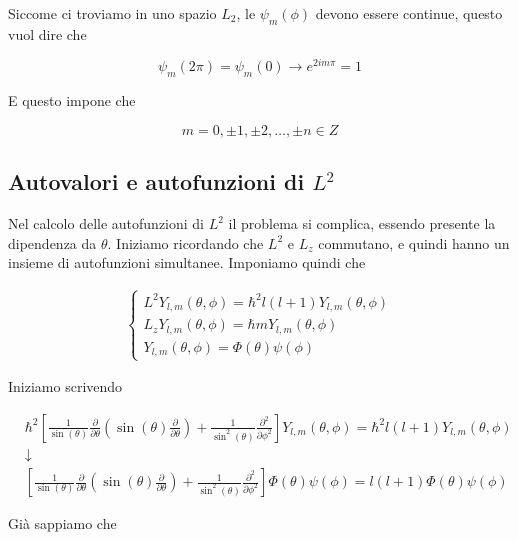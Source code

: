 Siccome ci troviamo in uno spazio $L_2$, le $\psi_m(\phi)$ devono essere continue, questo vuol dire che

\begin{equation}
\psi_m(2\pi)= \psi_m(0) \rightarrow e^{2i m \pi}= 1
\end{equation}

E questo impone che 

\begin{equation}
m= 0, \pm 1, \pm 2, \dots , \pm n  \in Z
\end{equation}

\newpage

\subsection{Autovalori e autofunzioni di $L^2$}

Nel calcolo delle autofunzioni di $L^2$ il problema si complica, essendo presente la dipendenza da $\theta$. Iniziamo ricordando che $L^2$ e $L_z$ commutano, e quindi hanno un insieme di autofunzioni simultanee. Imponiamo quindi che

\begin{align}
\left\{\begin{array}{ccc}
L^2 Y_{l,m}(\theta, \phi)= \hbar^2 l(l+1) Y_{l,m} (\theta, \phi)\\
L_z Y_{l,m}(\theta, \phi)= \hbar m Y_{l,m}(\theta, \phi) \qquad \; \: \\
Y_{l,m}(\theta, \phi)= \Phi(\theta)\psi(\phi) \qquad \; \; \,
\end{array}\right. 
\end{align}

Iniziamo scrivendo

\begin{align}
{}&\hbar^2 \left[\frac{1}{\sin(\theta)}\frac{\partial}{\partial \theta}\left(\sin(\theta)\frac{\partial}{\partial \theta}\right) + \frac{1}{\sin^2(\theta)}\frac{\partial^2}{\partial \phi^2} 
\right] Y_{l,m}(\theta, \phi)= \hbar^2 l(l+1) Y_{l,m} (\theta, \phi) \nonumber \\
&\downarrow \nonumber \\
&\left[\frac{1}{\sin(\theta)}\frac{\partial}{\partial \theta}\left(\sin(\theta)\frac{\partial}{\partial \theta}\right) + \frac{1}{\sin^2(\theta)}\frac{\partial^2}{\partial \phi^2} 
\right] \Phi(\theta)\psi(\phi)= l(l+1) \Phi(\theta)\psi(\phi)
\end{align}

Già sappiamo che

